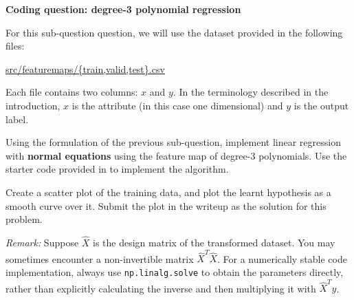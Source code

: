 \item {} {\bf Coding question: degree-3 polynomial regression}


For this sub-question question, we will use the dataset provided in
the following files:
%
\begin{center}
	\url{src/featuremaps/{train,valid,test}.csv}
\end{center}
%

Each file contains two columns: $x$ and $y$. In the terminology described in the introduction, $x$ is the attribute (in this case one dimensional) and $y$ is the output label.

Using the formulation of the previous sub-question, implement linear regression with \textbf{normal equations} using the feature map of degree-3 polynomials. Use the starter code provided in  to implement the algorithm.

Create a scatter plot of the training data, and plot the learnt hypothesis as a smooth curve over it. Submit the plot in the writeup as the solution for this problem.

\emph{Remark: } Suppose $\widehat{X}$ is the design matrix of the transformed dataset. You may sometimes encounter a non-invertible matrix $\widehat{X}^T\widehat{X}$. For a numerically stable code implementation, always use \texttt{np.linalg.solve} to obtain the parameters directly, rather than explicitly calculating the inverse and then multiplying it with $\widehat{X}^Ty$.


